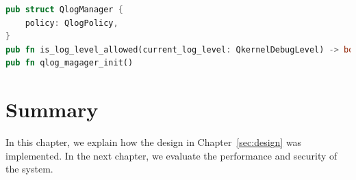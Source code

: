 \begin{lstlisting}[language=rust, caption= API of Qlog manager, label={lst:Qlog}]
pub struct QlogManager {
    policy: QlogPolicy,
}
pub fn is_log_level_allowed(current_log_level: QkernelDebugLevel) -> bool
pub fn qlog_magager_init()   
\end{lstlisting}


\section{Summary}
In this chapter, we explain how the design in Chapter~\ref{sec:design} was implemented. In the next chapter, we evaluate the performance and security of the system.


\cleardoublepage




